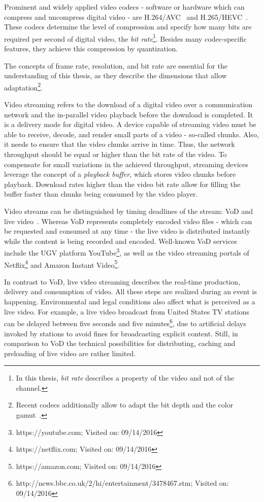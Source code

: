 Prominent and widely applied video codecs - software or hardware which can compress and uncompress digital video - are H.264/\ac{AVC}~\cite{Wiegand2003} and H.265/\ac{HEVC}~\cite{Sullivan2012}.
These codecs determine the level of compression and specify how many bits are required per second of digital video, the \emph{bit rate}\footnote{In this thesis, \emph{bit rate} describes a property of the video and not of the channel.}.
Besides many codec-specific features, they achieve this compression by quantization.

The concepts of frame rate, resolution, and bit rate are essential for the understanding of this thesis, as they describe the dimensions that allow adaptation\footnote{Recent codecs additionally allow to adapt the bit depth and the color gamut~\protect\cite{Sullivan2012}.}.

Video streaming refers to the download of a digital video over a communication network and the in-parallel video playback before the download is completed.
It is a delivery mode for digital video.
A device capable of streaming video must be able to receive, decode, and render small parts of a video - so-called chunks.
Also, it needs to ensure that the video chunks arrive in time.
Thus, the network throughput should be equal or higher than the bit rate of the video.
To compensate for small variations in the achieved throughput, streaming devices leverage the concept of a \emph{playback buffer}, which stores video chunks before playback.
Download rates higher than the video bit rate allow for filling the buffer faster than chunks being consumed by the video player.

Video streams can be distinguished by timing deadlines of the stream: \ac{VoD} and live video~\cite{Liu2003}.
Whereas \ac{VoD} represents completely encoded video files - which can be requested and consumed at any time - the live video is distributed instantly while the content is being recorded and encoded.
Well-known \ac{VoD} services include the \ac{UGV} platform YouTube\footnote{https://youtube.com; Visited on: 09/14/2016}, as well as the video streaming portals of Netflix\footnote{https://netflix.com; Visited on: 09/14/2016} and Amazon Instant Video\footnote{https://amazon.com; Visited on: 09/14/2016}.

In contrast to \ac{VoD}, live video streaming describes the real-time production, delivery and consumption of video. 
All these steps are realized during an event is happening.
Environmental and legal conditions also affect what is perceived as a live video.
For example, a live video broadcast from United States \ac{TV} stations can be delayed between five seconds and five minutes\footnote{http://news.bbc.co.uk/2/hi/entertainment/3478467.stm; Visited on: 09/14/2016}, due to artificial delays invoked by stations to avoid fines for broadcasting explicit content.
Still, in comparison to \ac{VoD} the technical possibilities for distributing, caching and preloading of live video are rather limited. 
